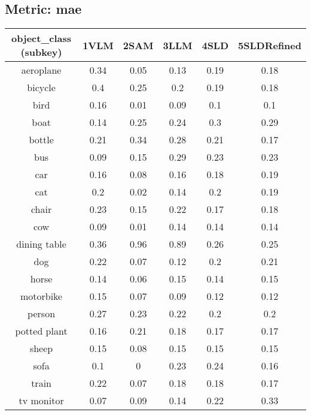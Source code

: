 \subsection*{Metric: mae}
\begin{center}
    \begin{tabular}{cccccc}
        \toprule
        object\_class (subkey) & 1VLM & 2SAM & 3LLM & 4SLD & 5SLDRefined \\
        \midrule
        aeroplane & 0.34 & 0.05 & 0.13 & 0.19 & 0.18 \\
        bicycle & 0.4 & 0.25 & 0.2 & 0.19 & 0.18 \\
        bird & 0.16 & 0.01 & 0.09 & 0.1 & 0.1 \\
        boat & 0.14 & 0.25 & 0.24 & 0.3 & 0.29 \\
        bottle & 0.21 & 0.34 & 0.28 & 0.21 & 0.17 \\
        bus & 0.09 & 0.15 & 0.29 & 0.23 & 0.23 \\
        car & 0.16 & 0.08 & 0.16 & 0.18 & 0.19 \\
        cat & 0.2 & 0.02 & 0.14 & 0.2 & 0.19 \\
        chair & 0.23 & 0.15 & 0.22 & 0.17 & 0.18 \\
        cow & 0.09 & 0.01 & 0.14 & 0.14 & 0.14 \\
        dining table & 0.36 & 0.96 & 0.89 & 0.26 & 0.25 \\
        dog & 0.22 & 0.07 & 0.12 & 0.2 & 0.21 \\
        horse & 0.14 & 0.06 & 0.15 & 0.14 & 0.15 \\
        motorbike & 0.15 & 0.07 & 0.09 & 0.12 & 0.12 \\
        person & 0.27 & 0.23 & 0.22 & 0.2 & 0.2 \\
        potted plant & 0.16 & 0.21 & 0.18 & 0.17 & 0.17 \\
        sheep & 0.15 & 0.08 & 0.15 & 0.15 & 0.15 \\
        sofa & 0.1 & 0 & 0.23 & 0.24 & 0.16 \\
        train & 0.22 & 0.07 & 0.18 & 0.18 & 0.17 \\
        tv monitor & 0.07 & 0.09 & 0.14 & 0.22 & 0.33 \\
        \bottomrule
    \end{tabular}
\end{center}

